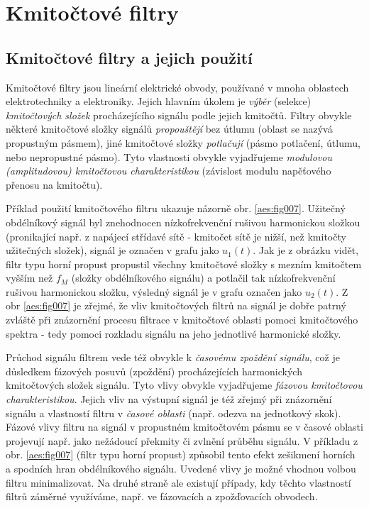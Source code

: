 \setchaptertoc
\chapter{Kmitočtové filtry}

  \section{Kmitočtové filtry a jejich použití}
    Kmitočtové filtry jsou lineární elektrické obvody, používané v mnoha oblastech elektrotechniky a
    elektroniky. Jejich hlavním úkolem je \emph{výběr} (selekce) \emph{kmitočtových složek}
    procházejícího signálu podle jejich kmitočtů. Filtry obvykle některé kmitočtové složky signálů
    \emph{propouštějí} bez útlumu (oblast se nazývá propustným pásmem), jiné kmitočtové složky
    \emph{potlačují} (pásmo potlačení, útlumu, nebo nepropustné pásmo). Tyto vlastnosti obvykle
    vyjadřujeme \emph{modulovou (amplitudovou) kmitočtovou charakteristikou} (závislost modulu
    napěťového přenosu na kmitočtu).

    Příklad použití kmitočtového filtru ukazuje názorně obr. \ref{aes:fig007}. Užitečný obdélníkový
    signál byl znehodnocen nízkofrekvenční rušivou harmonickou složkou (pronikající např. z
    napájecí střídavé sítě - kmitočet sítě je nižší, než kmitočty užitečných složek), signál je
    označen v grafu jako \(u_1(t)\). Jak je z obrázku vidět, filtr typu horní propust propustil
    všechny kmitočtové složky s mezním kmitočtem vyšším než \(f_M\) (složky obdélníkového signálu) a
    potlačil tak nízkofrekvenční rušivou harmonickou složku, výsledný signál je v grafu označen jako
    \(u_2(t)\). Z obr \ref{aes:fig007} je zřejmé, že vliv kmitočtových filtrů na signál je dobře
    patrný zvláště při znázornění procesu filtrace v kmitočtové oblasti pomoci kmitočtového spektra
    - tedy pomoci rozkladu signálu na jeho jednotlivé harmonické složky.

    Průchod signálu filtrem vede též obvykle k \emph{časovému zpoždění signálu}, což je důsledkem
    fázových posuvů (zpoždění) procházejících harmonických kmitočtových složek signálu. Tyto vlivy
    obvykle vyjadřujeme \emph{fázovou kmitočtovou charakteristikou}. Jejich vliv na výstupní signál
    je též zřejmý při znázornění signálu a vlastností filtru v \emph{časové oblasti} (např. odezva
    na jednotkový skok). Fázové vlivy filtru na signál v propustném kmitočtovém pásmu se v časové
    oblasti projevují např. jako nežádoucí překmity či zvlnění průběhu signálu. V příkladu z obr.
    \ref{aes:fig007} (filtr typu horní propust) způsobil tento efekt zešikmení horních a spodních
    hran obdélníkového signálu. Uvedené vlivy je možné vhodnou volbou filtru minimalizovat. Na druhé
    straně ale existují případy, kdy těchto vlastností filtrů záměrné využíváme, např. ve fázovacích
    a zpožďovacích obvodech.

